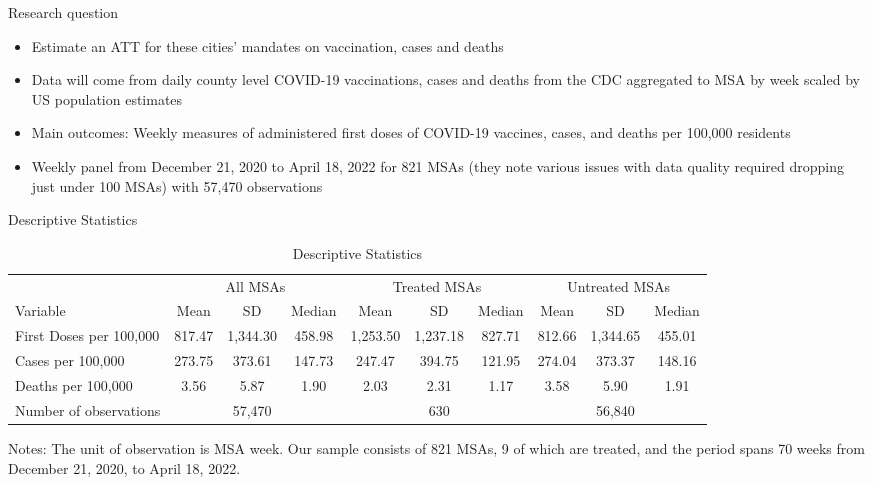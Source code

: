 \documentclass{beamer}
\begin{document}
\begin{frame}{Research question}

\begin{itemize}
\item Estimate an ATT for these cities' mandates on vaccination, cases and deaths
\item Data will come from daily county level COVID-19 vaccinations, cases and deaths from the CDC aggregated to MSA by week scaled by US population estimates
\item Main outcomes: Weekly measures of administered first doses of COVID-19 vaccines, cases, and deaths per 100,000 residents
\item Weekly panel from December 21, 2020 to April 18, 2022 for 821 MSAs (they note various issues with data quality required dropping just under 100 MSAs) with 57,470 observations
\end{itemize}

\end{frame}

\begin{frame}[shrink=20]{Descriptive Statistics}

\begin{table}[ht]
\centering \tiny
\caption{Descriptive Statistics}
\begin{tabular}{lccccccccc}
\toprule\toprule
 & \multicolumn{3}{c}{All MSAs} & \multicolumn{3}{c}{Treated MSAs} & \multicolumn{3}{c}{Untreated MSAs} \\ \cmidrule(lr){2-4} \cmidrule(lr){5-7} \cmidrule(lr){8-10}
Variable              & Mean & SD & Median & Mean & SD & Median & Mean & SD & Median \\ \midrule
First Doses per 100,000  & 817.47 & 1,344.30 & 458.98 & 1,253.50 & 1,237.18 & 827.71 & 812.66 & 1,344.65 & 455.01 \\
Cases per 100,000        & 273.75 & 373.61 & 147.73 & 247.47 & 394.75 & 121.95 & 274.04 & 373.37 & 148.16 \\
Deaths per 100,000       & 3.56 & 5.87 & 1.90 & 2.03 & 2.31 & 1.17 & 3.58 & 5.90 & 1.91 \\
Number of observations  & & 57,470 & & & 630 & & & 56,840 & \\ \bottomrule\bottomrule
\end{tabular}
\tiny \newline Notes: The unit of observation is MSA week. Our sample consists of 821 MSAs, 9 of which are treated, and the period spans 70 weeks from December 21, 2020, to April 18, 2022.
\end{table}

\end{frame}
\end{document}
